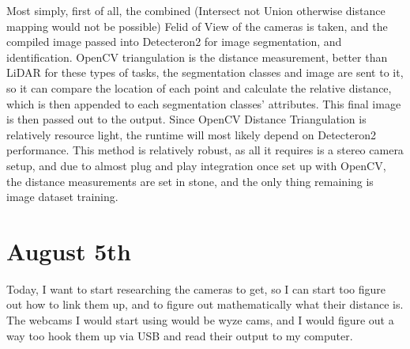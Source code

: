 \documentclass{article}
\begin{document}
Most simply, first of all, the combined (Intersect not Union otherwise distance mapping would not be possible) Felid of View of the cameras is taken, and the compiled image passed into Detecteron2 for image segmentation, and identification. OpenCV triangulation is the distance measurement, better than LiDAR for these types of tasks, the segmentation classes and image are sent to it, so it can compare the location of each point and calculate the relative distance, which is then appended to each segmentation classes' attributes. This final image is then passed out to the output. Since OpenCV Distance Triangulation is relatively resource light, the runtime will most likely depend on Detecteron2 performance. This method is relatively robust, as all it requires is a stereo camera setup, and due to almost plug and play integration once set up with OpenCV, the distance measurements are set in stone, and the only thing remaining is image dataset training.

\section{August 5th}

Today, I want to start researching the cameras to get, so I can start too figure out how to link them up, and to figure out mathematically what their distance is. The webcams I would start using would be wyze cams, and I would figure out a way too hook them up via USB and read their output to my computer.
\end{document}
